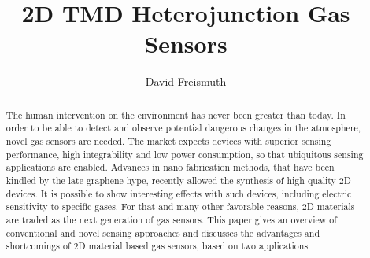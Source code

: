 \documentclass{article}
\begin{document}
\title{2D TMD Heterojunction Gas Sensors}
\author{David Freismuth}

\maketitle

\begin{abstract}
The human intervention on the environment has never been greater than today. In order to be able to detect and observe potential dangerous changes in the atmosphere, novel gas sensors are needed. The market expects devices with superior sensing performance, high integrability and low power consumption, so that ubiquitous sensing applications are enabled. Advances in nano fabrication methods, that have been kindled by the late graphene hype, recently allowed the synthesis of high quality 2D devices. It is possible to show interesting effects with such devices, including electric sensitivity to specific gases. For that and many other favorable reasons, 2D materials are traded as the next generation of gas sensors. This paper gives an overview of conventional and novel sensing approaches and discusses the advantages and shortcomings of 2D material based gas sensors, based on two applications. 
\end{abstract}









\printglossaries
\end{document}
